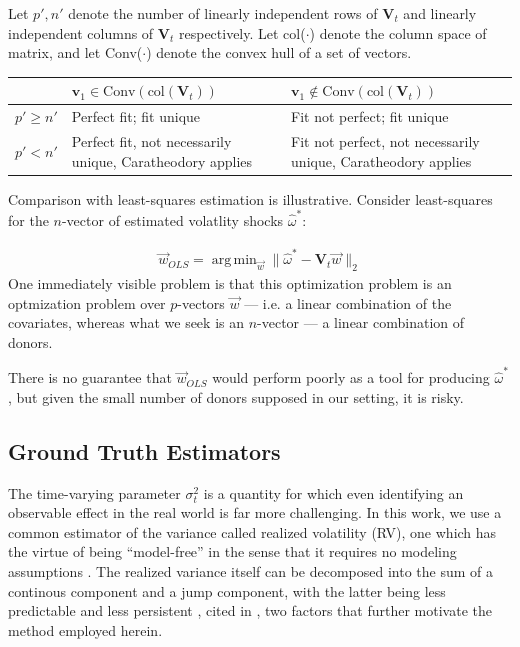\documentclass[11pt]{article}
\newcommand{\V}{\textbf{V}}
\DeclareMathOperator*{\argmin}{arg\,min} %
\theoremstyle{definition}
\begin{document}
Let $p', n'$ denote the number of linearly independent rows of $\V_{t}$ and linearly independent columns of $\V_{t}$ respectively.  Let col($\cdot$) denote the column space of matrix, and let Conv($\cdot$) denote the convex hull of a set of vectors.  \\

    \begin{center}
      \begin{tabular}{ | m{3em} | m{7cm}| m{7cm} | } 
        \hline
        & $\textbf{v}_{1}\in \text{Conv}(\text{col}(\V_{t}))$ & $\textbf{v}_{1} \notin \text{Conv}(\text{col}(\V_{t}))$\\ 
        \hline
        $p' \geq n'$ & Perfect fit; fit unique & Fit not perfect; fit unique \\
        \hline
        $p' < n'$ & Perfect fit, not necessarily unique, Caratheodory applies \citep{abadie2022synthetic}& Fit not perfect, not necessarily unique, Caratheodory applies \\ 
        \hline
      \end{tabular}
      \end{center}

Comparison with least-squares estimation is illustrative.  Consider least-squares for the $n$-vector of estimated volatlity shocks $\hat\omega^{*}$:

\begin{align*}{
\vec{w}_{OLS}=\argmin_{\vec{w}} \|\hat{\omega}^{*} - \textbf{V}_{t}\vec{w}\|_{2}}
\end{align*} 
One immediately visible problem is that this optimization problem is an optmization problem over $p$-vectors $\vec{w}$ --- i.e. a linear combination of the covariates, whereas what we seek is an $n$-vector --- a linear combination of donors.

There is no guarantee that $\vec{w}_{OLS}$ would perform poorly as a tool for producing $\hat\omega^{*}$, but given the small number of donors supposed in our setting, it is risky.
    \subsection{Ground Truth Estimators}
    \label{Ground Truth Estimators}
    
    The time-varying parameter $\sigma^{2}_{t}$ is a quantity for which even identifying an observable effect in the real world is far more challenging.  In this work, we use a common estimator of the variance called realized volatility (RV), one which has the virtue of being ``model-free'' in the sense that it requires no modeling assumptions \citep{andersen2010stochastic}.  The realized variance itself can be decomposed into the sum of a continous component and a jump component, with the latter being less predictable and less persistent \citep{andersen2007roughing}, cited in \citet{de2006forecasting}, two factors that further motivate the method employed herein.
    
\end{document}

